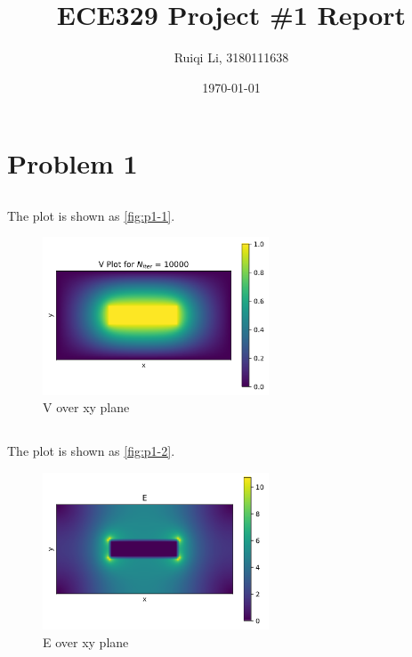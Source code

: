 \documentclass{article}
\title{\textbf{ECE329 Project \#1 Report}}
\author{Ruiqi Li, 3180111638}
\date{\today}
\begin{document}
\renewcommand{\algorithmicrequire}{\textbf{Input:}}  %
\renewcommand{\algorithmicensure}{\textbf{Output:}} %
\newcommand{\algorithmautorefname}{Algorithm} %

\maketitle

\section{Problem 1}

    \subsection{}

        The plot is shown as \autoref{fig:p1-1}.

        \begin{figure}[H]
            \centering
            \includegraphics[width=0.6\textwidth]{img/p1_1.png}
            \caption{V over xy plane}
            \label{fig:p1-1}
        \end{figure}

    \subsection{}

        The plot is shown as \autoref{fig:p1-2}.

        \begin{figure}[H]
            \centering
            \includegraphics[width=0.6\textwidth]{img/p1_2.png}
            \caption{E over xy plane}
            \label{fig:p1-2}
        \end{figure}
\end{document}
